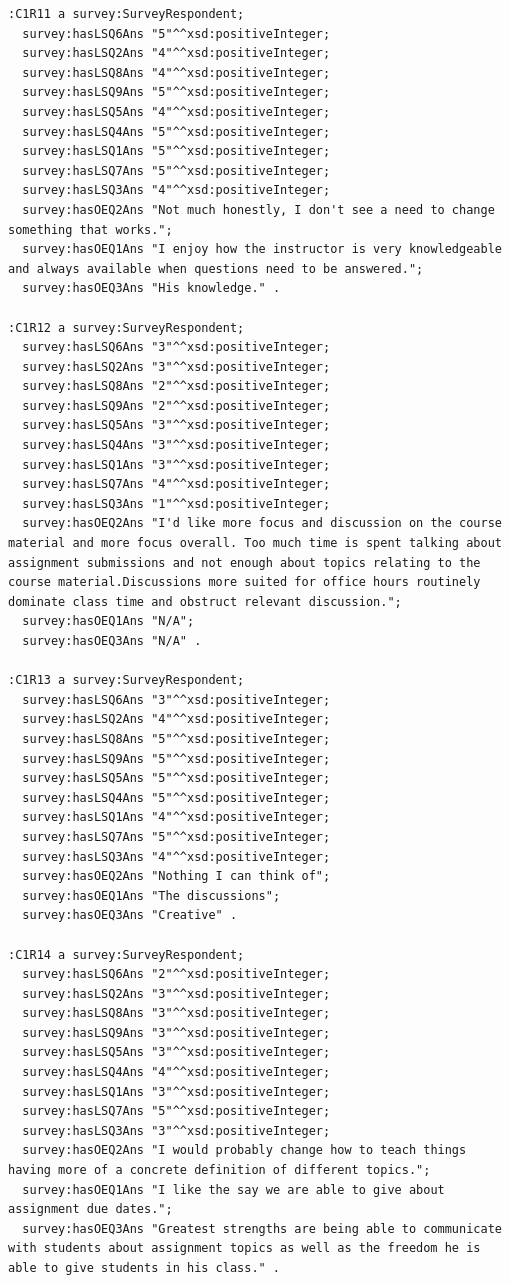 \begin{lstlisting}
:C1R11 a survey:SurveyRespondent;
  survey:hasLSQ6Ans "5"^^xsd:positiveInteger;
  survey:hasLSQ2Ans "4"^^xsd:positiveInteger;
  survey:hasLSQ8Ans "4"^^xsd:positiveInteger;
  survey:hasLSQ9Ans "5"^^xsd:positiveInteger;
  survey:hasLSQ5Ans "4"^^xsd:positiveInteger;
  survey:hasLSQ4Ans "5"^^xsd:positiveInteger;
  survey:hasLSQ1Ans "5"^^xsd:positiveInteger;
  survey:hasLSQ7Ans "5"^^xsd:positiveInteger;
  survey:hasLSQ3Ans "4"^^xsd:positiveInteger;
  survey:hasOEQ2Ans "Not much honestly, I don't see a need to change something that works.";
  survey:hasOEQ1Ans "I enjoy how the instructor is very knowledgeable and always available when questions need to be answered.";
  survey:hasOEQ3Ans "His knowledge." .

:C1R12 a survey:SurveyRespondent;
  survey:hasLSQ6Ans "3"^^xsd:positiveInteger;
  survey:hasLSQ2Ans "3"^^xsd:positiveInteger;
  survey:hasLSQ8Ans "2"^^xsd:positiveInteger;
  survey:hasLSQ9Ans "2"^^xsd:positiveInteger;
  survey:hasLSQ5Ans "3"^^xsd:positiveInteger;
  survey:hasLSQ4Ans "3"^^xsd:positiveInteger;
  survey:hasLSQ1Ans "3"^^xsd:positiveInteger;
  survey:hasLSQ7Ans "4"^^xsd:positiveInteger;
  survey:hasLSQ3Ans "1"^^xsd:positiveInteger;
  survey:hasOEQ2Ans "I'd like more focus and discussion on the course material and more focus overall. Too much time is spent talking about assignment submissions and not enough about topics relating to the course material.Discussions more suited for office hours routinely dominate class time and obstruct relevant discussion.";
  survey:hasOEQ1Ans "N/A";
  survey:hasOEQ3Ans "N/A" .

:C1R13 a survey:SurveyRespondent;
  survey:hasLSQ6Ans "3"^^xsd:positiveInteger;
  survey:hasLSQ2Ans "4"^^xsd:positiveInteger;
  survey:hasLSQ8Ans "5"^^xsd:positiveInteger;
  survey:hasLSQ9Ans "5"^^xsd:positiveInteger;
  survey:hasLSQ5Ans "5"^^xsd:positiveInteger;
  survey:hasLSQ4Ans "5"^^xsd:positiveInteger;
  survey:hasLSQ1Ans "4"^^xsd:positiveInteger;
  survey:hasLSQ7Ans "5"^^xsd:positiveInteger;
  survey:hasLSQ3Ans "4"^^xsd:positiveInteger;
  survey:hasOEQ2Ans "Nothing I can think of";
  survey:hasOEQ1Ans "The discussions";
  survey:hasOEQ3Ans "Creative" .

:C1R14 a survey:SurveyRespondent;
  survey:hasLSQ6Ans "2"^^xsd:positiveInteger;
  survey:hasLSQ2Ans "3"^^xsd:positiveInteger;
  survey:hasLSQ8Ans "3"^^xsd:positiveInteger;
  survey:hasLSQ9Ans "3"^^xsd:positiveInteger;
  survey:hasLSQ5Ans "3"^^xsd:positiveInteger;
  survey:hasLSQ4Ans "4"^^xsd:positiveInteger;
  survey:hasLSQ1Ans "3"^^xsd:positiveInteger;
  survey:hasLSQ7Ans "5"^^xsd:positiveInteger;
  survey:hasLSQ3Ans "3"^^xsd:positiveInteger;
  survey:hasOEQ2Ans "I would probably change how to teach things having more of a concrete definition of different topics.";
  survey:hasOEQ1Ans "I like the say we are able to give about assignment due dates.";
  survey:hasOEQ3Ans "Greatest strengths are being able to communicate with students about assignment topics as well as the freedom he is able to give students in his class." .


\end{lstlisting}
